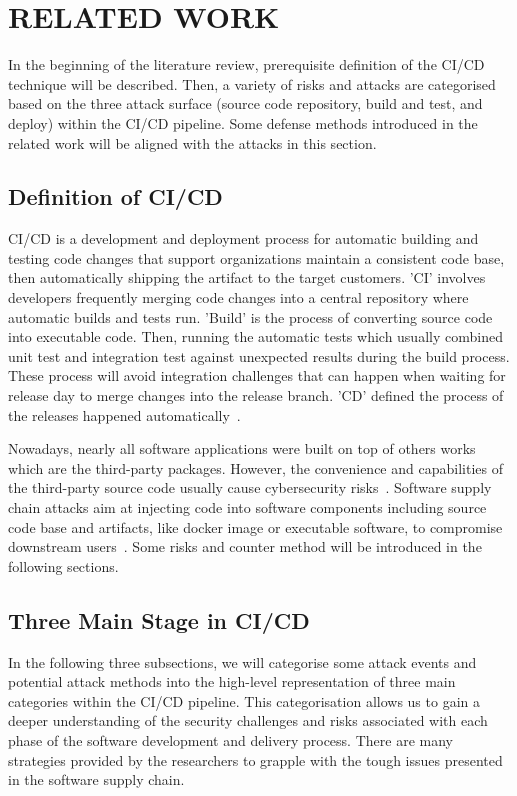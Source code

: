 \section{RELATED WORK}
In the beginning of the literature review, prerequisite definition of the CI/CD technique will be 
described. Then, a variety of risks and attacks are categorised based on the three attack 
surface (source code repository, build and test, and deploy) within the CI/CD pipeline.
Some defense methods introduced in the related work will be aligned with the attacks in this 
section. 

\subsection{Definition of CI/CD}
CI/CD is a development and deployment process for automatic building and testing code
changes that support organizations maintain a consistent code base, then automatically shipping 
the artifact to the target customers. 'CI' involves developers frequently merging code changes 
into a central repository where automatic builds and tests run. 'Build' is the process of 
converting source code into executable code. Then, running the automatic tests which usually 
combined unit test and integration test against unexpected results during the build process. These process will avoid integration 
challenges that can happen when waiting for release day to merge changes into the release branch. 
'CD' defined the process of the releases happened automatically~\cite{DoDDefCI/CD2023}. 

Nowadays, nearly all software applications were built on top of others works which are the third-party packages.
However, the convenience and capabilities of the third-party source code usually cause cybersecurity 
risks~\cite{mastrangelo2015use}. Software supply chain attacks aim at injecting code into software
components including source code base and artifacts, like docker image or executable software,
to compromise downstream users~\cite{ladisa2023sok, OWASP2023}. 
Some risks and counter method will be introduced in the following sections.

\subsection{Three Main Stage in CI/CD}
In the following three subsections, 
we will categorise some attack events and potential attack methods into the high-level representation 
of three main categories within the CI/CD pipeline. This categorisation allows us to gain a deeper understanding of 
the security challenges and risks associated with each phase of the software development and delivery process.
There are many strategies provided by the researchers to grapple with the tough issues presented in the software 
supply chain. 

